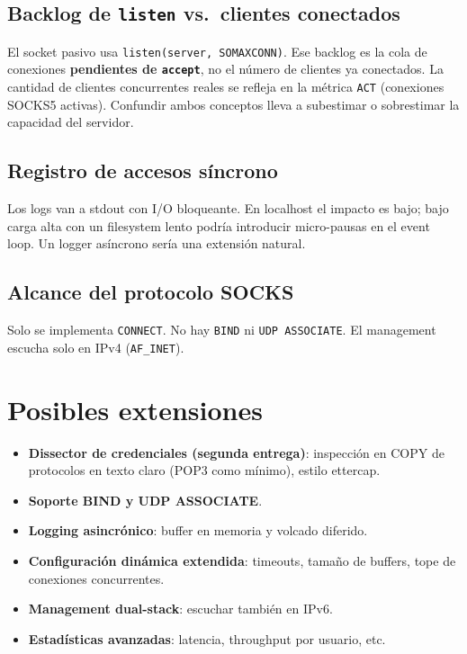 \documentclass[12pt,a4paper]{article}
\begin{document}
\subsection{Backlog de \texttt{listen} vs.\ clientes conectados}

El socket pasivo usa \texttt{listen(server, SOMAXCONN)}. Ese backlog es la cola de
conexiones \textbf{pendientes de \texttt{accept}}, no el número de clientes ya
conectados. La cantidad de clientes concurrentes reales se refleja en la métrica
\texttt{ACT} (conexiones SOCKS5 activas). Confundir ambos conceptos lleva a
subestimar o sobrestimar la capacidad del servidor.

\subsection{Registro de accesos síncrono}

Los logs van a stdout con I/O bloqueante. En localhost el impacto es bajo; bajo
carga alta con un filesystem lento podría introducir micro-pausas en el event loop.
Un logger asíncrono sería una extensión natural.

\subsection{Alcance del protocolo SOCKS}

Solo se implementa \texttt{CONNECT}. No hay \texttt{BIND} ni \texttt{UDP ASSOCIATE}.
El management escucha solo en IPv4 (\texttt{AF\_INET}).

\section{Posibles extensiones}

\begin{itemize}
    \item \textbf{Dissector de credenciales (segunda entrega)}: inspección en COPY
          de protocolos en texto claro (POP3 como mínimo), estilo ettercap.
    \item \textbf{Soporte BIND y UDP ASSOCIATE}.
    \item \textbf{Logging asincrónico}: buffer en memoria y volcado diferido.
    \item \textbf{Configuración dinámica extendida}: timeouts, tamaño de buffers,
          tope de conexiones concurrentes.
    \item \textbf{Management dual-stack}: escuchar también en IPv6.
    \item \textbf{Estadísticas avanzadas}: latencia, throughput por usuario, etc.
\end{itemize}
\end{document}
